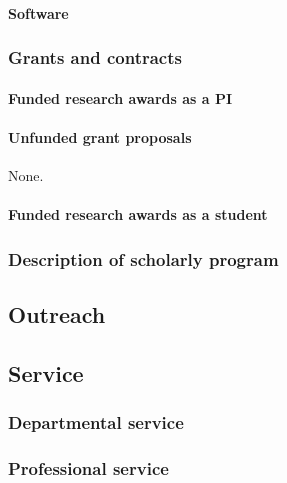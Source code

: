 \paragraph{Software}


\subsubsection{Grants and contracts}

\paragraph{Funded research awards as a PI}


\paragraph{Unfunded grant proposals}
None.

\paragraph{Funded research awards as a student}


\subsubsection{Description of scholarly program}


\subsection{Outreach}


\subsection{Service}

\subsubsection{Departmental service}


\subsubsection{Professional service}




